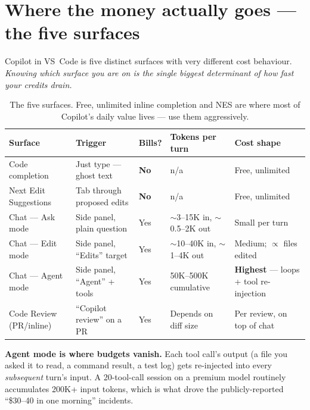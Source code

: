 \documentclass[11pt,a4paper]{article}
\begin{document}
\section{Where the money actually goes --- the five surfaces}\label{sec:surfaces}

Copilot in VS~Code is five distinct surfaces with very different cost behaviour. \emph{Knowing which surface you are on is the single biggest determinant of how fast your credits drain.}

\begin{table}[h]
\centering\footnotesize
\begin{tabular}{@{}L{2.8cm}L{2.8cm}L{1.1cm}L{3.0cm}L{3.0cm}@{}}
\toprule
\textbf{Surface} & \textbf{Trigger} & \textbf{Bills?} & \textbf{Tokens per turn} & \textbf{Cost shape} \\
\midrule
Code completion & Just type --- ghost text & \textcolor{successgreen}{\textbf{No}} & n/a & Free, unlimited \\
Next Edit Suggestions & Tab through proposed edits & \textcolor{successgreen}{\textbf{No}} & n/a & Free, unlimited \\
Chat --- Ask mode & Side panel, plain question & Yes & $\sim$3--15K in, $\sim$0.5--2K out & Small per turn \\
Chat --- Edit mode & Side panel, ``Edits'' target & Yes & $\sim$10--40K in, $\sim$1--4K out & Medium; $\propto$ files edited \\
Chat --- Agent mode & Side panel, ``Agent'' + tools & Yes & 50K--500K cumulative & \textbf{Highest} --- loops + tool re-injection \\
Code Review (PR/inline) & ``Copilot review'' on a PR & Yes & Depends on diff size & Per review, on top of chat \\
\bottomrule
\end{tabular}
\caption{The five surfaces. Free, unlimited inline completion and NES are where most of Copilot's daily value lives --- use them aggressively.}
\end{table}

\textbf{Agent mode is where budgets vanish.} Each tool call's output (a file you asked it to read, a command result, a test log) gets re-injected into every \emph{subsequent} turn's input. A 20-tool-call session on a premium model routinely accumulates 200K+ input tokens, which is what drove the publicly-reported ``\$30--40 in one morning'' incidents.

\end{document}
